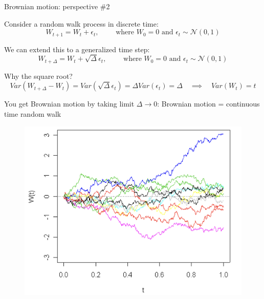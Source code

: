 \documentclass[11pt, aspectratio=169]{beamer}
\newenvironment{witemize}{\itemize\addtolength{\itemsep}{10pt}}{\enditemize}
\begin{document}
\begin{frame}{Brownian motion: perspective \#2}
\begin{witemize}
\item Consider a random walk process in discrete time:
\begin{equation*}
	W_{t+1} = W_t + \epsilon_t, 
	\quad\quad \text{ where } 
	W_0 = 0 \text{ and } 
	\epsilon_t \sim \mathcal N(0, 1)
\end{equation*}

\item We can extend this to a generalized time step:
\begin{equation*}
	W_{t+\Delta} = W_t + \sqrt{\Delta} \epsilon_t, 
	\quad\quad \text{ where } 
	W_0 = 0 \text{ and } 
	\epsilon_t \sim \mathcal N(0, 1)
\end{equation*}

\item Why the square root? 
\begin{equation*}
	Var(W_{t + \Delta} - W_t) = Var(\sqrt{\Delta} \epsilon_t)
	= \Delta Var(\epsilon_t) = \Delta
	\quad \implies \quad
	Var(W_t) = t
\end{equation*}

\item You get Brownian motion by taking limit $\Delta \to 0$: Brownian motion = continuous time random walk
\end{witemize}
\end{frame}


\begin{frame}{}
	\begin{figure}
		\includegraphics[scale=0.3]{./Brownian5}
	\end{figure}
\end{frame}
\end{document}
